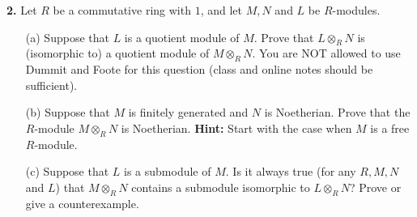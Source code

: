 \documentclass[12pt]{article}
\begin{document}
{\bf 2.} Let $R$ be a commutative ring with $1$, and let
$M,N$ and $L$ be $R$-modules.
\begin{itemize}
\item[(a)] Suppose that $L$ is a quotient module of $M$. Prove that $L\otimes_R N$ is 
(isomorphic to) a quotient module of $M\otimes_R N$. You are NOT allowed to use Dummit and Foote for this question (class and online notes should be sufficient).
\item[(b)] Suppose that $M$ is finitely generated and $N$ is Noetherian.
Prove that the $R$-module $M\otimes_R N$ is Noetherian.
{\bf Hint:} Start with the case when $M$ is a free $R$-module.
\item[(c)] Suppose that $L$ is a submodule of $M$. Is it always true
(for any $R,M,N$ and $L$) that $M\otimes_R N$ contains a submodule 
isomorphic to $L\otimes_R N$? Prove or give a counterexample.
\end{itemize}
\end{document}
